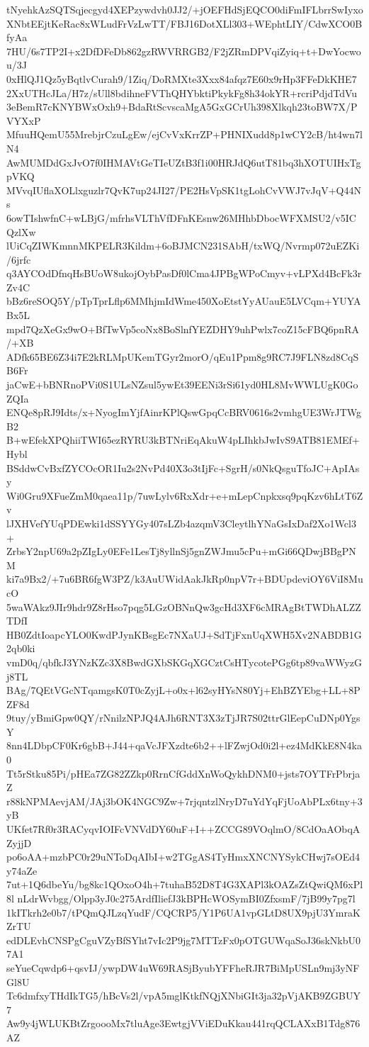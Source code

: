 tNyehkAzSQTSqjecgyd4XEPzywdvh0JJ2/+jOEFHdSjEQCO0diFmIFLbrrSwIyxo
XNbtEEjtKeRac8xWLudFrVzLwTT/FBJ16DotXLl303+WEphtLIY/CdwXCO0BfyAa
7HU/6s7TP2I+x2DfDFeDb862gzRWVRRGB2/F2jZRmDPVqiZyiq+t+DwYocwou/3J
0xHlQJ1Qz5yBqtlvCurah9/1Ziq/DoRMXte3Xxx84afqz7E60x9rHp3FFeDkKHE7
2XxUTHcJLa/H7z/sUll8bdihneFVThQHYbktiPkykFg8h34okYR+rcriPdjdTdVu
3eBemR7cKNYBWxOxh9+BdaRtScvscaMgA5GxGCrUh398Xlkqh23toBW7X/PVYXxP
MfuuHQemU55MrebjrCzuLgEw/ejCvVxKrrZP+PHNIXudd8p1wCY2cB/ht4wn7lN4
AwMUMDdGxJvO7f0IHMAVtGeTIeUZtB3f1i00HRJdQ6utT81bq3hXOTUIHxTgpVKQ
MVvqIUflaXOLlxguzlr7QvK7up24JI27/PE2HsVpSK1tgLohCvVWJ7vJqV+Q44Ns
6owTIshwfnC+wLBjG/mfrhsVLThVfDFnKEsnw26MHhbDbocWFXMSU2/v5ICQzlXw
lUiCqZIWKmnnMKPELR3Kildm+6oBJMCN231SAbH/txWQ/Nvrmp072uEZKi/6jrfc
q3AYCOdDfnqHsBUoW8ukojOybPasDf0lCma4JPBgWPoCmyv+vLPXd4BcFk3rZv4C
bBz6reSOQ5Y/pTpTprLflp6MMhjmIdWme450XoEtstYyAUauE5LVCqm+YUYABx5L
mpd7QzXeGx9wO+BfTwVp5coNx8BoSlnfYEZDHY9uhPwlx7coZ15cFBQ6pnRA/+XB
ADfk65BE6Z34i7E2kRLMpUKemTGyr2morO/qEu1Ppm8g9RC7J9FLN8zd8CqSB6Fr
jaCwE+bBNRnoPVi0S1ULsNZsul5ywEt39EENi3rSi61yd0HL8MvWWLUgK0GoZQIa
ENQe8pRJ9Idts/x+NyogImYjfAinrKPlQswGpqCcBRV0616s2vmhgUE3WrJTWgB2
B+wEfekXPQhiiTWI65ezRYRU3kBTNriEqAkuW4pLIhkbJwIvS9ATB81EMEf+Hybl
BSddwCvBxfZYCOcOR1Iu2s2NvPd40X3o3tIjFc+SgrH/s0NkQsguTfoJC+ApIAsy
Wi0Gru9XFueZmM0qaea11p/7uwLylv6RxXdr+e+mLepCnpkxsq9pqKzv6hLtT6Zv
lJXHVefYUqPDEwki1dSSYYGy407sLZb4azqmV3CleytlhYNaGsIxDaf2Xo1Wcl3+
ZrbsY2npU69a2pZIgLy0EFe1LesTj8yllnSj5gnZWJmu5cPu+mGi66QDwjBBgPNM
ki7a9Bx2/+7u6BR6fgW3PZ/k3AuUWidAakJkRp0npV7r+BDUpdeviOY6ViI8MucO
5waWAkz9JIr9hdr9Z8rHso7pqg5LGzOBNnQw3gcHd3XF6cMRAgBtTWDhALZZTDfI
HB0ZdtIoapcYLO0KwdPJynKBsgEc7NXaUJ+SdTjFxnUqXWH5Xv2NABDB1G2qb0ki
vmD0q/qbfkJ3YNzKZc3X8BwdGXbSKGqXGCztCsHTycotePGg6tp89vaWWyzGj8TL
BAg/7QEtVGcNTqamgsK0T0cZyjL+o0x+l62syHYsN80Yj+EhBZYEbg+LL+8PZF8d
9tuy/yBmiGpw0QY/rNnilzNPJQ4AJh6RNT3X3zTjJR7S02ttrGlEepCuDNp0YgsY
8nn4LDbpCF0Kr6gbB+J44+qaVcJFXzdte6b2++lFZwjOd0i2l+ez4MdKkE8N4ka0
Tt5rStku85Pi/pHEa7ZG82ZZkp0RrnCfGddXnWoQykhDNM0+jsts7OYTFrPbrjaZ
r88kNPMAevjAM/JAj3bOK4NGC9Zw+7rjqntzlNryD7uYdYqFjUoAbPLx6tny+3yB
UKfet7Rf0r3RACyqvIOIFcVNVdDY60uF+I++ZCCG89VOqlmO/8CdOaAObqAZyjjD
po6oAA+mzbPC0r29uNToDqAIbI+w2TGgAS4TyHmxXNCNYSykCHwj7sOEd4y74aZe
7ut+1Q6dbeYu/bg8kc1QOxoO4h+7tuhaB52D8T4G3XAPl3kOAZsZtQwiQM6xPl8l
nLdrWvbgg/Olpp3yJ0c275ArdfIliefJ3kBPHcWOSymBI0ZfxsmF/7jB99y7pg7l
1kITkrh2e0b7/tPQmQJLzqYudF/CQCRP5/Y1P6UA1vpGLtD8UX9pjU3YmraKZrTU
edDLEvhCNSPgCguVZyBfSYht7vIc2P9jg7MTTzFx0pOTGUWqaSoJ36skNkbU07A1
seYueCqwdp6+qsvIJ/ywpDW4uW69RASjByubYFFheRJR7BiMpUSLn9mj3yNFGl8U
Tc6dmfxyTHdIkTG5/hBcVs2l/vpA5mglKtkfNQjXNbiGIt3ja32pVjAKB9ZGBUY7
Aw9y4jWLUKBtZrgoooMx7tluAge3EwtgjVViEDuKkau441rqQCLAXxB1Tdg876AZ
